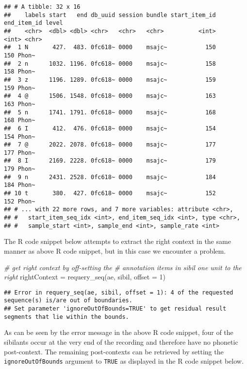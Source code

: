 \documentclass[
]{book}
\newenvironment{Shaded}{\begin{snugshade}}{\end{snugshade}}
\newcommand{\AttributeTok}[1]{\textcolor[rgb]{0.77,0.63,0.00}{#1}}
\newcommand{\CommentTok}[1]{\textcolor[rgb]{0.56,0.35,0.01}{\textit{#1}}}
\newcommand{\DecValTok}[1]{\textcolor[rgb]{0.00,0.00,0.81}{#1}}
\newcommand{\FunctionTok}[1]{\textcolor[rgb]{0.00,0.00,0.00}{#1}}
\newcommand{\NormalTok}[1]{#1}
\newcommand{\OtherTok}[1]{\textcolor[rgb]{0.56,0.35,0.01}{#1}}
\begin{document}
\begin{verbatim}
## # A tibble: 32 x 16
##    labels start   end db_uuid session bundle start_item_id end_item_id level
##    <chr>  <dbl> <dbl> <chr>   <chr>   <chr>          <int>       <int> <chr>
##  1 N       427.  483. 0fc618~ 0000    msajc~           150         150 Phon~
##  2 n      1032. 1196. 0fc618~ 0000    msajc~           158         158 Phon~
##  3 z      1196. 1289. 0fc618~ 0000    msajc~           159         159 Phon~
##  4 @      1506. 1548. 0fc618~ 0000    msajc~           163         163 Phon~
##  5 n      1741. 1791. 0fc618~ 0000    msajc~           168         168 Phon~
##  6 I       412.  476. 0fc618~ 0000    msajc~           154         154 Phon~
##  7 @      2022. 2078. 0fc618~ 0000    msajc~           177         177 Phon~
##  8 I      2169. 2228. 0fc618~ 0000    msajc~           179         179 Phon~
##  9 n      2431. 2528. 0fc618~ 0000    msajc~           184         184 Phon~
## 10 t       380.  427. 0fc618~ 0000    msajc~           152         152 Phon~
## # ... with 22 more rows, and 7 more variables: attribute <chr>,
## #   start_item_seq_idx <int>, end_item_seq_idx <int>, type <chr>,
## #   sample_start <int>, sample_end <int>, sample_rate <int>
\end{verbatim}

The R code snippet below attempts to extract the right context in the same manner as above R code snippet, but in this case we encounter a problem.

\begin{Shaded}
\begin{Highlighting}[]
\CommentTok{\# get right context by off{-}setting the }
\CommentTok{\# annotation items in sibil one unit to the right}
\NormalTok{rightContext }\OtherTok{=} \FunctionTok{requery\_seq}\NormalTok{(ae, sibil, }\AttributeTok{offset =} \DecValTok{1}\NormalTok{)}
\end{Highlighting}
\end{Shaded}

\begin{verbatim}
## Error in requery_seq(ae, sibil, offset = 1): 4 of the requested sequence(s) is/are out of boundaries.
## Set parameter 'ignoreOutOfBounds=TRUE' to get residual result segments that lie within the bounds.
\end{verbatim}

As can be seen by the error message in the above R code snippet, four of the sibilants occur at the very end of the recording and therefore have no phonetic post-context. The remaining post-contexts can be retrieved by setting the \texttt{ignoreOutOfBounds} argument to \texttt{TRUE} as displayed in the R code snippet below.
\end{document}

